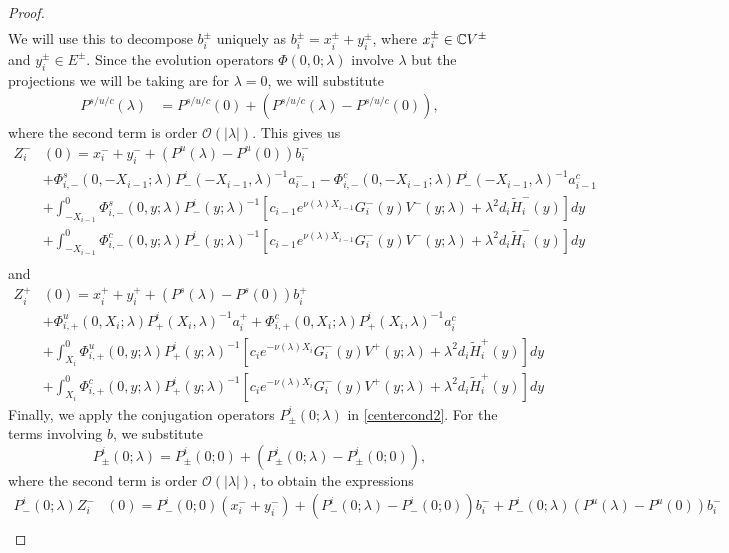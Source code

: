 \documentclass[thesis.tex]{subfiles}
\begin{document}
\begin{lemma}
\begin{proof}
\begin{align*}
\end{align*}
We will use this to decompose $b_i^\pm$ uniquely as $b_i^\pm = x_i^\pm + y_i^\pm$, where $x_i^\pm \in \mathbb{C} V^\pm$ and $y_i^\pm \in E^\pm$. Since the evolution operators $\Phi(0, 0; \lambda)$ involve $\lambda$ but the projections we will be taking are for $\lambda = 0$, we will substitute
\begin{align*}
P^{s/u/c}(\lambda) &= P^{s/u/c}(0) + (P^{s/u/c}(\lambda) - P^{s/u/c}(0)),
\end{align*}
where the second term is order $\mathcal{O}(|\lambda|)$. This gives us
\begin{align*}
Z_i^-&(0) = x_i^- + y_i^- + (P^u(\lambda) - P^u(0))b_i^- \\
&+ \Phi^s_{i,-}(0, -X_{i-1}; \lambda) P^i_-(-X_{i-1}, \lambda)^{-1} a_{i-1}^- - \Phi^c_{i,-}(0, -X_{i-1}; \lambda) P^i_-(-X_{i-1}, \lambda)^{-1} a_{i-1}^c \\
&+ \int_{-X_{i-1}}^0 \Phi^s_{i,-}(0, y; \lambda) P^i_-(y; \lambda)^{-1}[ c_{i-1} e^{\nu(\lambda)X_{i-1}} G_i^-(y) V^-(y; \lambda) + \lambda^2 d_i \tilde{H}_i^-(y)] dy \\
&+ \int_{-X_{i-1}}^0 \Phi^c_{i,-}(0, y; \lambda) P^i_-(y; \lambda)^{-1}[ c_{i-1} e^{\nu(\lambda)X_{i-1}} G_i^-(y) V^-(y; \lambda) + \lambda^2 d_i \tilde{H}_i^-(y)] dy  \\
\end{align*}
and
\begin{align*}
Z_i^+&(0) = x_i^+ + y_i^+ + (P^s(\lambda) - P^s(0)) b_i^+ \\
&+\Phi^u_{i,+}(0, X_i; \lambda) P^i_+(X_i, \lambda)^{-1} a_i^+ + \Phi^c_{i,+}(0, X_i; \lambda) P^i_+(X_i, \lambda)^{-1} a_i^c \\
&+ \int_{X_i}^0 \Phi^u_{i,+}(0, y; \lambda) P^i_+(y; \lambda)^{-1} [ c_i e^{-\nu(\lambda)X_i} G_i^-(y)V^+(y; \lambda) + \lambda^2 d_i \tilde{H}_i^+(y)] dy \\
&+ \int_{X_i}^0 \Phi^c_{i,+}(0, y; \lambda) P^i_+(y; \lambda)^{-1} [ c_i e^{-\nu(\lambda)X_i} G_i^-(y)V^+(y; \lambda) + \lambda^2 d_i \tilde{H}_i^+(y)] dy 
\end{align*}
Finally, we apply the conjugation operators $P^i_\pm(0; \lambda)$ in \eqref{centercond2}. For the terms involving $b$, we substitute
\[
P^i_\pm(0; \lambda) = P^i_\pm(0; 0) + (P^i_\pm(0; \lambda) - P^i_\pm(0; 0)),
\]
where the second term is order $\mathcal{O}(|\lambda|)$, to obtain the expressions
\begin{align*}
P^i_-(0; \lambda) Z_i^-&(0) = P^i_-(0; 0)(x_i^- + y_i^-) + (P^i_-(0; \lambda) - P^i_-(0; 0))b_i^- + P^i_-(0; \lambda)(P^u(\lambda) - P^u(0))b_i^- \\

\end{align*}
\end{proof}
\end{lemma}
\end{document}
